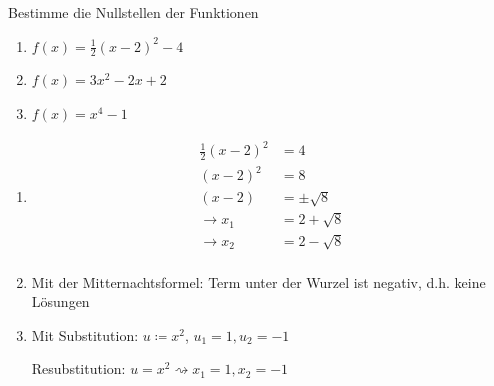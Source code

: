  Bestimme die Nullstellen der Funktionen
\begin{multicols}{3}
  \begin{enumerate}
    \item $f(x) = \frac 1 2 (x-2)^2 -4$
    \item $f(x) = 3x^2-2x+2$
    \item $f(x) = x^4-1$
  \end{enumerate}
\end{multicols}
\begin{lsg}{}
  \begin{multicols}{3}
    \begin{enumerate}
      \item \begin{align*}
        \frac 1 2 (x-2)^2 &= 4\\
        (x-2)^2 &= 8\\
        (x-2)&=\pm\sqrt 8\\
        \rightarrow x_1&=2+\sqrt 8\\
        \rightarrow x_2&=2-\sqrt 8\\
      \end{align*}
      \columnbreak
      \item Mit der Mitternachtsformel: Term unter der Wurzel ist negativ, d.h. keine Lösungen
      \columnbreak
      \item Mit Substitution: $u\coloneqq x^2$, $u_1=1, u_2=-1$

			Resubstitution: $u=x^2 \rightsquigarrow x_1=1, x_2=-1$
    \end{enumerate}
  \end{multicols}
\end{lsg}

